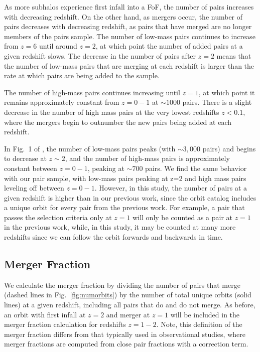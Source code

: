 \documentclass[twocolumn,linenumbers]{aastex631}
\newcommand{\chambe}{\citet{Chamberlain2024}}
\begin{document}
As more subhalos experience first infall into a FoF, the number of pairs increases with decreasing redshift. 
On the other hand, as mergers occur, the number of pairs decreases with decreasing redshift, as pairs that have merged are no longer members of the pairs sample.
The number of low-mass pairs continues to increase from $z=6$ until around $z=2$, at which point the number of added pairs at a given redshift slows. 
The decrease in the number of pairs after $z=2$ means that the number of low-mass pairs that are merging at each redshift is larger than the rate at which pairs are being added to the sample.

The number of high-mass pairs continues increasing until $z=1$, at which point it remains approximately constant from $z=0-1$ at $\sim1000$ pairs. 
There is a slight decrease in the number of high mass pairs at the very lowest redshifts $z<0.1$, where the mergers begin to outnumber the new pairs being added at each redshift.

In Fig.~1 of \chambe{}, the number of low-mass pairs peaks (with $\sim3,000$ pairs) and begins to decrease at $z\sim2$, and the number of high-mass pairs is approximately constant between $z=0-1$, peaking at $\sim700$ pairs. 
We find the same behavior with our pair sample, with low-mass pairs peaking at z=2 and high mass pairs leveling off between $z=0-1$. 
However, in this study, the number of pairs at a given redshift is higher than in our previous work, since the orbit catalog includes a unique orbit for every pair from the previous work.
For example, a pair that passes the \chambe{} selection criteria only at $z=1$ will only be counted as a pair at $z=1$ in the previous work, while, in this study, it may be counted at many more redshifts since we can follow the orbit forwards and backwards in time. 

\subsection{Merger Fraction}\label{sec:pairprops-frac}
We calculate the merger fraction by dividing the number of pairs that merge (dashed lines in Fig.~\ref{fig:numorbits}) by the number of total unique orbits (solid lines) at a given redshift, including all pairs that do and do not merge. 
As before, an orbit with first infall at $z=2$ and merger at $z=1$ will be included in the merger fraction calculation for redshifts $z=1-2$.
Note, this definition of the merger fraction differs from that typically used in observational studies, where merger fractions are computed from close pair fractions with a correction term. 
\end{document}
